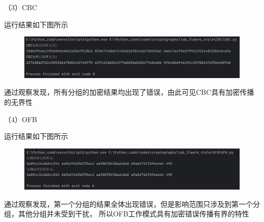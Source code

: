 \documentclass[a4paper,11pt,UTF8]{ctexart}
\newcommand{\bottomcaption}{%
\setlength{\abovecaptionskip}{6pt}%
\setlength{\belowcaptionskip}{6pt}%
\caption}
\newcommand{\xiaowuhao}{\fontsize{9pt}{\baselineskip}\selectfont}   %
\begin{document}
            （3）CBC\par
                运行结果如下图所示
                \begin{figure}[H]
                    \centering
                    \includegraphics[width=13cm]{CBC_result_2.png}
                    \bottomcaption{\xiaowuhao{CBC修改一位明文两次加密结果}}
                \end{figure}
                通过观察发现，所有分组的加密结果均出现了错误，由此可见CBC具有加密传播的无界性\par
                
            （4）OFB\par
                运行结果如下图所示
                \begin{figure}[H]
                    \centering
                    \includegraphics[width=13cm]{OFB_result_2.png}
                    \bottomcaption{\xiaowuhao{OFB修改一位明文两次加密结果}}
                \end{figure}
                通过观察发现，第一个分组的结果全体出现错误，但是影响范围只涉及到第一个分组，其他分组并未受到干扰，
                所以OFB工作模式具有加密错误传播有界的特性\par
\end{document}
